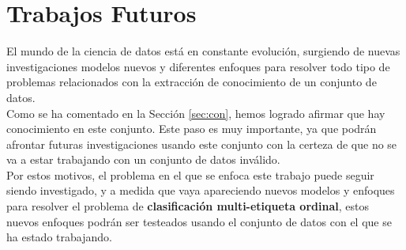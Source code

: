\chapter{Trabajos Futuros}
El mundo de la ciencia de datos está en constante evolución, surgiendo de nuevas investigaciones modelos nuevos y diferentes enfoques para resolver todo tipo de problemas relacionados con la extracción de conocimiento de un conjunto de datos.\\
\linebreak
Como se ha comentado en la Sección \ref{sec:con}, hemos logrado afirmar que hay conocimiento en este conjunto. Este paso es muy importante, ya que podrán afrontar futuras investigaciones usando este conjunto con la certeza de que no se va a estar trabajando con un conjunto de datos inválido.\\
\linebreak
Por estos motivos, el problema en el que se enfoca este trabajo puede seguir siendo investigado, y a medida que vaya apareciendo nuevos modelos y enfoques para resolver el problema de\textbf{ clasificación multi-etiqueta ordinal}, estos nuevos enfoques podrán ser testeados usando el conjunto de datos con el que se ha estado trabajando.\\
\linebreak

